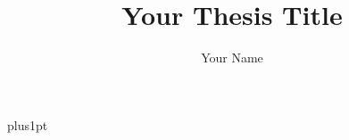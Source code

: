 \documentclass[oneside,12pt]{Latex/Classes/PhDthesisPSnPDF}
\title{Your Thesis Title}
\author{Your Name}
\begin{document}
\baselineskip=18pt plus1pt

\maketitl

\frontmatter

%





\begingroup
\tableofcontents
\endgroup

\begingroup
\listoffigures
\endgroup


\mainmatter







\begingroup


\endgroup

\end{document}
